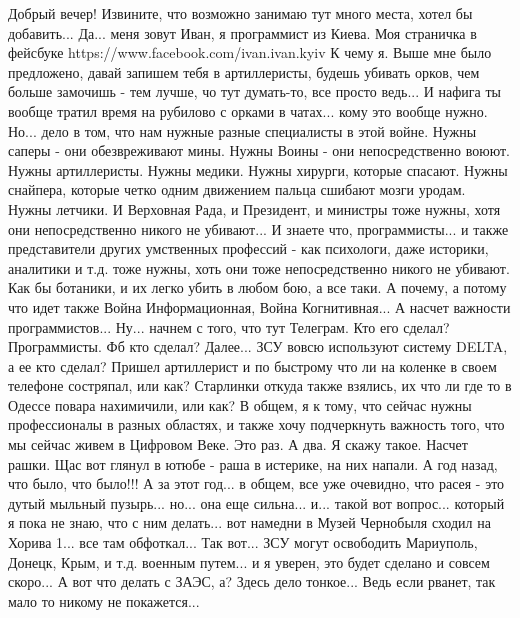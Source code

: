Добрый вечер! Извините, что возможно занимаю тут много места, хотел бы
добавить... Да... меня зовут Иван, я программист из Киева. Моя страничка в
фейсбуке https://www.facebook.com/ivan.ivan.kyiv   К чему я. Выше мне было
предложено, давай запишем тебя в артиллеристы, будешь убивать орков, чем больше
замочишь - тем лучше, чо тут думать-то, все просто ведь... И нафига ты вообще
тратил время на рубилово с орками в чатах... кому это вообще нужно. Но...  дело
в том, что нам нужные разные специалисты в этой войне. Нужны саперы - они
обезвреживают мины. Нужны Воины - они непосредственно воюют. Нужны
артиллеристы. Нужны медики. Нужны хирурги, которые спасают. Нужны снайпера,
которые четко одним движением пальца сшибают мозги уродам. Нужны летчики. И
Верховная Рада, и Президент, и министры тоже нужны, хотя они непосредственно
никого не убивают... И знаете что, программисты... и также представители других
умственных профессий - как психологи, даже историки, аналитики и т.д. тоже
нужны, хоть они тоже непосредственно никого не убивают. Как бы ботаники, и их
легко убить в любом бою, а все таки. А почему, а потому что идет также Война
Информационная, Война Когнитивная... А насчет важности программистов... Ну...
начнем с того, что тут Телеграм. Кто его сделал? Программисты. Фб кто сделал?
Далее... ЗСУ вовсю используют систему DELTA, а ее кто сделал? Пришел
артиллерист и по быстрому что ли на коленке в своем телефоне состряпал, или
как? Старлинки откуда также взялись, их что ли где то в Одессе повара
нахимичили, или как? В общем, я к тому, что сейчас нужны профессионалы в разных
областях, и также хочу подчеркнуть важность того, что мы сейчас живем в
Цифровом Веке. Это раз. А два. Я скажу такое. Насчет рашки. Щас вот глянул в
ютюбе - раша в истерике, на них напали. А год назад, что было, что было!!! А за
этот год... в общем, все уже очевидно, что расея - это дутый мыльный пузырь...
но... она еще сильна... и... такой вот вопрос... который я пока не знаю, что с
ним делать... вот намедни в Музей Чернобыля сходил на Хорива 1... все там
обфоткал... Так вот...  ЗСУ могут освободить Мариуполь, Донецк, Крым, и т.д.
военным путем... и я уверен, это будет сделано и совсем скоро... А вот что
делать с ЗАЭС, а? Здесь дело тонкое... Ведь если рванет, так мало то никому не
покажется...


